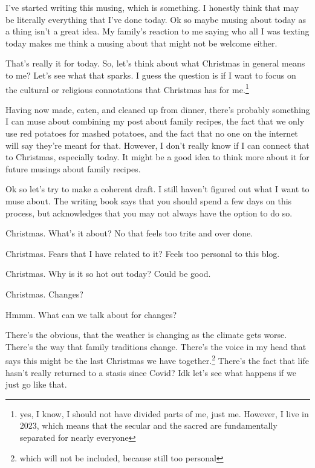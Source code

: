 \documentclass[12pt]{article}[titlepage]
\newcommand{\1}{\={a}}
\newcommand{\2}{\={e}}
\newcommand{\3}{\={\i}}
\newcommand{\4}{\=o}
\newcommand{\5}{\=u}
\newcommand{\6}{\={A}}
\renewcommand{\,}{\textsuperscript{,}}
\begin{document}
I've started writing this musing, which is something.
I honestly think that may be literally everything that I've done today.
Ok so maybe musing about today as a thing isn't a great idea.
My family's reaction to me saying who all I was texting today makes me think a musing about that might not be welcome either.

That's really it for today.
So, let's think about what Christmas in general means to me?
Let's see what that sparks.
I guess the question is if I want to focus on the cultural or religious connotations that Christmas has for me.\footnote{yes, I know, I should not have divided parts of me, just me. However, I live in 2023, which means that the secular and the sacred are fundamentally separated for nearly everyone}

Having now made, eaten, and cleaned up from dinner, there's probably something I can muse about combining my post about family recipes, the fact that we only use red potatoes for mashed potatoes, and the fact that no one on the internet will say they're meant for that.
However, I don't really know if I can connect that to Christmas, especially today.
It might be a good idea to think more about it for future musings about family recipes.

Ok so let's try to make a coherent draft.
I still haven't figured out what I want to muse about.
The writing book says that you should spend a few days on this process, but acknowledges that you may not always have the option to do so.

Christmas.
What's it about?
No that feels too trite and over done.

Christmas.
Fears that I have related to it?
Feels too personal to this blog.

Christmas.
Why is it so hot out today?
Could be good.

Christmas.
Changes?

Hmmm.
What can we talk about for changes?

There's the obvious, that the weather is changing as the climate gets worse.
There's the way that family traditions change.
There's the voice in my head that says this might be the last Christmas we have together.\footnote{which will not be included, because still too personal}
There's the fact that life hasn't really returned to a stasis since Covid?
Idk let's see what happens if we just go like that.
\end{document}
